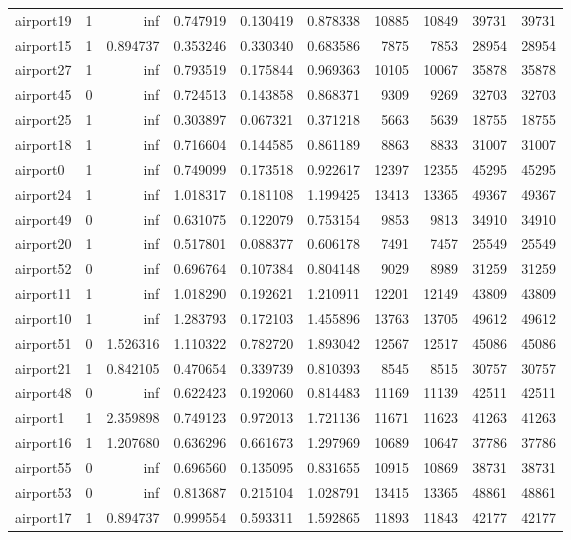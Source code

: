 \begin{longtable}{|l|r|r|r|r|r|r|r|r|r|}
airport19 & 1 & inf & 0.747919 & 0.130419 & 0.878338 & 10885 & 10849 & 39731 & 39731 \\
airport15 & 1 & 0.894737 & 0.353246 & 0.330340 & 0.683586 & 7875 & 7853 & 28954 & 28954 \\
airport27 & 1 & inf & 0.793519 & 0.175844 & 0.969363 & 10105 & 10067 & 35878 & 35878 \\
airport45 & 0 & inf & 0.724513 & 0.143858 & 0.868371 & 9309 & 9269 & 32703 & 32703 \\
airport25 & 1 & inf & 0.303897 & 0.067321 & 0.371218 & 5663 & 5639 & 18755 & 18755 \\
airport18 & 1 & inf & 0.716604 & 0.144585 & 0.861189 & 8863 & 8833 & 31007 & 31007 \\
airport0 & 1 & inf & 0.749099 & 0.173518 & 0.922617 & 12397 & 12355 & 45295 & 45295 \\
airport24 & 1 & inf & 1.018317 & 0.181108 & 1.199425 & 13413 & 13365 & 49367 & 49367 \\
airport49 & 0 & inf & 0.631075 & 0.122079 & 0.753154 & 9853 & 9813 & 34910 & 34910 \\
airport20 & 1 & inf & 0.517801 & 0.088377 & 0.606178 & 7491 & 7457 & 25549 & 25549 \\
airport52 & 0 & inf & 0.696764 & 0.107384 & 0.804148 & 9029 & 8989 & 31259 & 31259 \\
airport11 & 1 & inf & 1.018290 & 0.192621 & 1.210911 & 12201 & 12149 & 43809 & 43809 \\
airport10 & 1 & inf & 1.283793 & 0.172103 & 1.455896 & 13763 & 13705 & 49612 & 49612 \\
airport51 & 0 & 1.526316 & 1.110322 & 0.782720 & 1.893042 & 12567 & 12517 & 45086 & 45086 \\
airport21 & 1 & 0.842105 & 0.470654 & 0.339739 & 0.810393 & 8545 & 8515 & 30757 & 30757 \\
airport48 & 0 & inf & 0.622423 & 0.192060 & 0.814483 & 11169 & 11139 & 42511 & 42511 \\
airport1 & 1 & 2.359898 & 0.749123 & 0.972013 & 1.721136 & 11671 & 11623 & 41263 & 41263 \\
airport16 & 1 & 1.207680 & 0.636296 & 0.661673 & 1.297969 & 10689 & 10647 & 37786 & 37786 \\
airport55 & 0 & inf & 0.696560 & 0.135095 & 0.831655 & 10915 & 10869 & 38731 & 38731 \\
airport53 & 0 & inf & 0.813687 & 0.215104 & 1.028791 & 13415 & 13365 & 48861 & 48861 \\
airport17 & 1 & 0.894737 & 0.999554 & 0.593311 & 1.592865 & 11893 & 11843 & 42177 & 42177 \\

\end{longtable}
